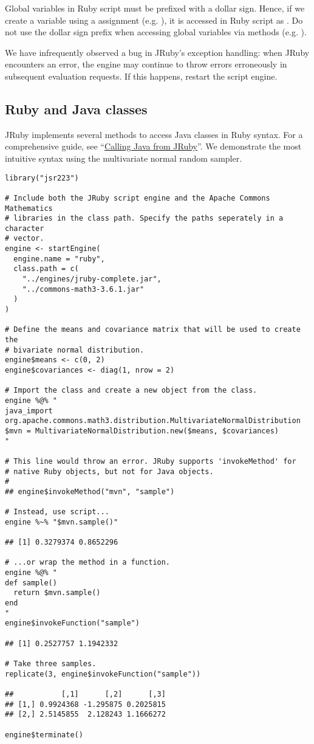
 Global variables in Ruby script must be prefixed with a dollar sign. Hence, if we create a variable  using a  assignment (e.g. ), it is accessed in Ruby script as . Do not use the dollar sign prefix when accessing global variables via  methods (e.g. ).

 We have infrequently observed a bug in JRuby's exception handling: when JRuby encounters an error, the engine may continue to throw errors erroneously in subsequent evaluation requests. If this happens, restart the script engine.

\subsection{Ruby and Java classes}

JRuby implements several methods to access Java classes in Ruby syntax. For a comprehensive guide, see “\href{https://github.com/jruby/jruby/wiki/CallingJavaFromJRuby}{Calling Java from JRuby}”. We demonstrate the most intuitive syntax using the multivariate normal random sampler.

\begin{verbatim}
library("jsr223")

# Include both the JRuby script engine and the Apache Commons Mathematics
# libraries in the class path. Specify the paths seperately in a character
# vector.
engine <- startEngine(
  engine.name = "ruby", 
  class.path = c(
    "../engines/jruby-complete.jar",
    "../commons-math3-3.6.1.jar"
  )
)

# Define the means and covariance matrix that will be used to create the 
# bivariate normal distribution.
engine$means <- c(0, 2)
engine$covariances <- diag(1, nrow = 2)

# Import the class and create a new object from the class.
engine %@% "
java_import org.apache.commons.math3.distribution.MultivariateNormalDistribution
$mvn = MultivariateNormalDistribution.new($means, $covariances)
"

# This line would throw an error. JRuby supports 'invokeMethod' for
# native Ruby objects, but not for Java objects.
# 
## engine$invokeMethod("mvn", "sample")

# Instead, use script...
engine %~% "$mvn.sample()"

## [1] 0.3279374 0.8652296

# ...or wrap the method in a function.
engine %@% "
def sample()
  return $mvn.sample()
end
"
engine$invokeFunction("sample")

## [1] 0.2527757 1.1942332

# Take three samples.
replicate(3, engine$invokeFunction("sample"))

##           [,1]      [,2]      [,3]
## [1,] 0.9924368 -1.295875 0.2025815
## [2,] 2.5145855  2.128243 1.1666272

engine$terminate()
\end{verbatim}

